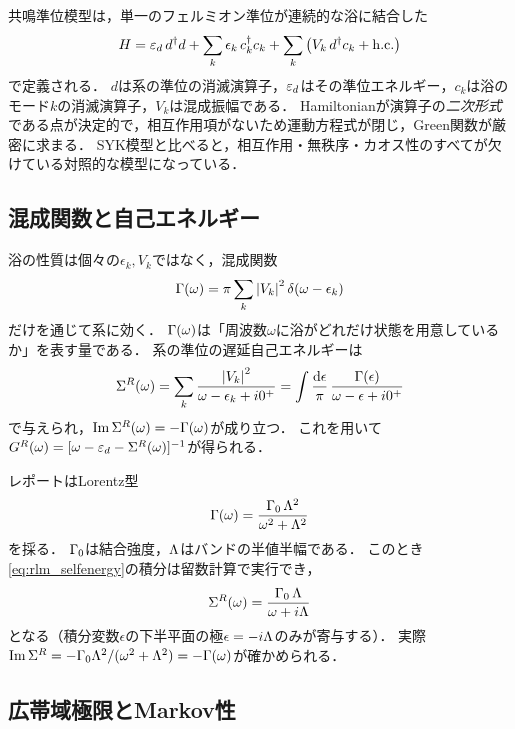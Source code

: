 \documentclass[a4paper,11pt,onecolumn]{jlreq}
\begin{document}
共鳴準位模型は，単一のフェルミオン準位が連続的な浴に結合した
\begin{equation}
  H = \varepsilon_{d}\, d^{\dagger}d
    + \sum_k \epsilon_k\, c_k^{\dagger}c_k
    + \sum_k\left(V_k\, d^{\dagger}c_k + \mathrm{h.c.}\right)
  \label{eq:rlm}
\end{equation}
で定義される．
$d$は系の準位の消滅演算子，$\varepsilon_{d}$はその準位エネルギー，$c_k$は浴のモード$k$の消滅演算子，$V_k$は混成振幅である．
Hamiltonianが演算子の\emph{二次形式}である点が決定的で，相互作用項がないため運動方程式が閉じ，Green関数が厳密に求まる．
SYK模型と比べると，相互作用・無秩序・カオス性のすべてが欠けている対照的な模型になっている．

\subsection{混成関数と自己エネルギー}
\label{sec:rlm_hyb}

浴の性質は個々の$\epsilon_k,V_k$ではなく，混成関数
\begin{equation}
  \Gamma(\omega) = \pi\sum_k\abs{V_k}^2\,\delta(\omega-\epsilon_k)
  \label{eq:hybridization}
\end{equation}
だけを通じて系に効く．
$\Gamma(\omega)$は「周波数$\omega$に浴がどれだけ状態を用意しているか」を表す量である．
系の準位の遅延自己エネルギーは
\begin{equation}
  \Sigma^{R}(\omega) = \sum_k\frac{\abs{V_k}^2}{\omega-\epsilon_k+i 0^+}
  = \int\frac{\dd{\epsilon}}{\pi}\,\frac{\Gamma(\epsilon)}{\omega-\epsilon+i 0^+}
  \label{eq:rlm_selfenergy}
\end{equation}
で与えられ，$\Im\Sigma^{R}(\omega)=-\Gamma(\omega)$が成り立つ．
これを用いて$G^{R}(\omega)=[\omega-\varepsilon_{d}-\Sigma^{R}(\omega)]^{-1}$が得られる．

レポートはLorentz型
\begin{equation}
  \Gamma(\omega) = \frac{\Gamma_0\,\Lambda^2}{\omega^2+\Lambda^2}
  \label{eq:lorentzian}
\end{equation}
を採る．
$\Gamma_0$は結合強度，$\Lambda$はバンドの半値半幅である．
このとき\eqref{eq:rlm_selfenergy}の積分は留数計算で実行でき，
\begin{equation}
  \Sigma^{R}(\omega) = \frac{\Gamma_0\,\Lambda}{\omega+i\Lambda}
  \label{eq:rlm_selfenergy_lorentz}
\end{equation}
となる（積分変数$\epsilon$の下半平面の極$\epsilon=-i\Lambda$のみが寄与する）．
実際$\Im\Sigma^{R}=-\Gamma_0\Lambda^2/(\omega^2+\Lambda^2)=-\Gamma(\omega)$が確かめられる．

\subsection{広帯域極限とMarkov性}
\label{sec:rlm_wbl}
\end{document}
